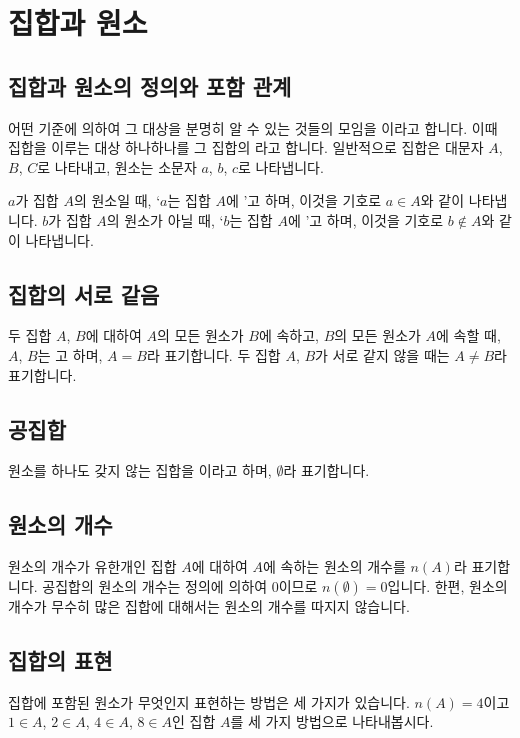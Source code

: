 \section{집합과 원소}
\subsection{집합과 원소의 정의와 포함 관계}
어떤 기준에 의하여 그 대상을 분명히 알 수 있는 것들의 모임을 이라고 합니다. 이때 집합을 이루는 대상 하나하나를 그 집합의 라고 합니다. 일반적으로 집합은 대문자 $A$, $B$, $C$로 나타내고, 원소는 소문자 $a$, $b$, $c$로 나타냅니다.

$a$가 집합 $A$의 원소일 때, `$a$는 집합 $A$에 '고 하며, 이것을 기호로 $a \in A$와 같이 나타냅니다. $b$가 집합 $A$의 원소가 아닐 때, `$b$는 집합 $A$에 '고 하며, 이것을 기호로 $b \not\in A$와 같이 나타냅니다. 

\subsection{집합의 서로 같음}
두 집합 $A$, $B$에 대하여 $A$의 모든 원소가 $B$에 속하고,  $B$의 모든 원소가 $A$에 속할 때, $A$, $B$는 고 하며, $A=B$라 표기합니다. 두 집합 $A$, $B$가 서로 같지 않을 때는 $A \neq B$라 표기합니다.

\subsection{공집합}
원소를 하나도 갖지 않는 집합을 이라고 하며, $\emptyset$라 표기합니다. 

\subsection{원소의 개수}
원소의 개수가 유한개인 집합 $A$에 대하여 $A$에 속하는 원소의 개수를 $n\left( A \right) $라 표기합니다. 공집합의 원소의 개수는 정의에 의하여 $0$이므로 $n\left( \emptyset \right)=0$입니다. 한편, 원소의 개수가 무수히 많은 집합에 대해서는 원소의 개수를 따지지 않습니다.

\subsection{집합의 표현}
집합에 포함된 원소가 무엇인지 표현하는 방법은 세 가지가 있습니다. $n\left( A \right) = 4$이고 $1 \in A$, $2 \in A$, $4 \in A$, $8 \in A$인 집합 $A$를 세 가지 방법으로 나타내봅시다.


